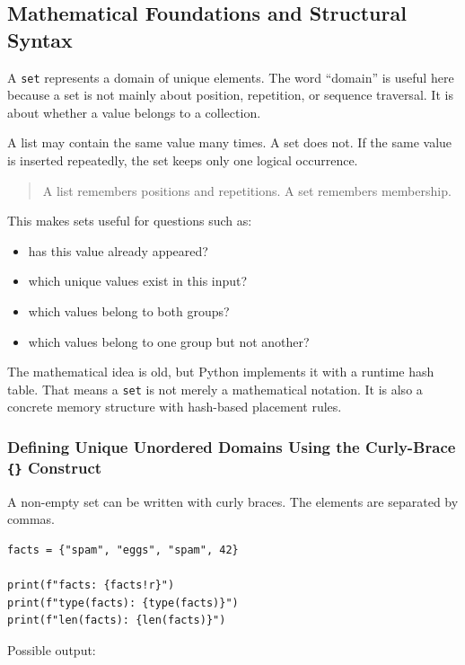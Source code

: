 \subsection{Mathematical Foundations and Structural Syntax}

A \texttt{set} represents a domain of unique elements. The word ``domain'' is useful here because a set is not mainly about position, repetition, or sequence traversal. It is about whether a value belongs to a collection.

A list may contain the same value many times. A set does not. If the same value is inserted repeatedly, the set keeps only one logical occurrence.

\begin{quote}
A list remembers positions and repetitions. A set remembers membership.
\end{quote}

This makes sets useful for questions such as:

\begin{itemize}
    \item has this value already appeared?
    \item which unique values exist in this input?
    \item which values belong to both groups?
    \item which values belong to one group but not another?
\end{itemize}

The mathematical idea is old, but Python implements it with a runtime hash table. That means a \texttt{set} is not merely a mathematical notation. It is also a concrete memory structure with hash-based placement rules.

\subsubsection{Defining Unique Unordered Domains Using the Curly-Brace \texttt{\{\}} Construct}

A non-empty set can be written with curly braces. The elements are separated by commas.

\begin{verbatim}
facts = {"spam", "eggs", "spam", 42}

print(f"facts: {facts!r}")
print(f"type(facts): {type(facts)}")
print(f"len(facts): {len(facts)}")
\end{verbatim}

Possible output:

